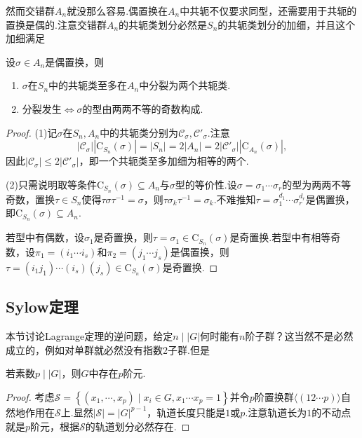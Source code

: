 然而交错群$A_n$就没那么容易.偶置换在$A_n$中共轭不仅要求同型，还需要用于共轭的置换是偶的.注意交错群$A_n$的共轭类划分必然是$S_n$的共轭类划分的加细，并且这个加细满足
\begin{prop}
	设$\sigma\in A_n$是偶置换，则
	\begin{enumerate}
		\item $\sigma$在$S_n$中的共轭类至多在$A_n$中分裂为两个共轭类.
		\item 分裂发生$\iff$$\sigma$的型由两两不等的奇数构成.
	\end{enumerate}
\end{prop}
\begin{proof}
	\hspace*{5.4pt}(1)记$\sigma$在$S_n,A_n$中的共轭类分别为$\mathcal{C}_\sigma,\mathcal{C}'_\sigma$.注意
	\[
		|\mathcal{C}_\sigma||\mathrm{C}_{S_n}(\sigma)|=|S_n|=2|A_n|=2|\mathcal{C}'_\sigma||\mathrm{C}_{A_n}(\sigma)|,
	\]
	因此$|\mathcal{C}_\sigma|\le 2|\mathcal{C}'_{\sigma}|$，即一个共轭类至多加细为相等的两个.
	
	(2)只需说明取等条件$\mathrm{C}_{S_n}(\sigma)\subseteq A_n$与$\sigma$型的等价性.设$\sigma=\sigma_1\cdots\sigma_r$的型为两两不等奇数，置换$\tau\in S_n$使得$\tau\sigma\tau^{-1}=\sigma$，则$\tau\sigma_k\tau^{-1}=\sigma_k$.不难推知$\tau=\sigma_1^{d_1}\cdots\sigma_r^{d_r}$是偶置换，即$\mathrm{C}_{S_n}(\sigma)\subseteq A_n$.
	
	若型中有偶数，设$\sigma_1$是奇置换，则$\tau=\sigma_1\in\mathrm{C}_{S_n}(\sigma)$是奇置换.若型中有相等奇数，设$\pi_1=(i_1\cdots i_s)$和$\pi_2=(j_1\cdots j_s)$是偶置换，则$\tau=(i_1j_1)\cdots(i_s)(j_s)\in\mathrm{C}_{S_n}(\sigma)$是奇置换.
\end{proof}
\subsection{Sylow定理}
本节讨论Lagrange定理的逆问题，给定$n\mid |G|$何时能有$n$阶子群？这当然不是必然成立的，例如对单群就必然没有指数2子群.但是
\begin{thm}[(Cauchy)]
	若素数$p\mid|G|$，则$G$中存在$p$阶元.\hypertarget{thm:Cauchy}{}
\end{thm}
\begin{proof}
	考虑$\mathcal{S}=\left\{(x_1,\cdots,x_p)\mid x_i\in G,x_1\cdots x_p=1\right\}$并令$p$阶置换群$\langle (12\cdots p)\rangle $自然地作用在$\mathcal{S}$上.显然$|\mathcal{S}|=|G|^{p-1}$，轨道长度只能是$1$或$p$.注意轨道长为$1$的不动点就是$p$阶元，根据$\mathcal{S}$的轨道划分必然存在.
\end{proof}

